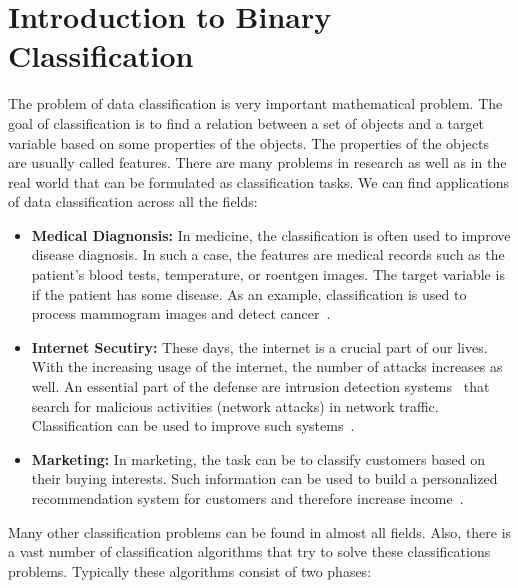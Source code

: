 \chapter{Introduction to Binary Classification}

The problem of data classification is very important mathematical problem. The goal of classification is to find a relation between a set of objects and a target variable based on some properties of the objects. The properties of the objects are usually called features. There are many problems in research as well as in the real world that can be formulated as classification tasks. We can find applications of data classification across all the fields:
\begin{itemize}
  \item \textbf{Medical Diagnonsis:} In medicine, the classification is often used to improve disease diagnosis. In such a case, the features are medical records such as the patient's blood tests, temperature, or roentgen images. The target variable is if the patient has some disease. As an example, classification is used to process mammogram images and detect cancer~\cite{viale2012current, levy2016breast}.
  \item \textbf{Internet Secutiry:} These days, the internet is a crucial part of our lives. With the increasing usage of the internet, the number of attacks increases as well. An essential part of the defense are intrusion detection systems~\cite{grill2016learning, scarfone2007guide} that search for malicious activities (network attacks) in network traffic. Classification can be used to improve such systems~\cite{giacinto2002intrusion, shanbhag2009accurate}.
  \item \textbf{Marketing:} In marketing, the task can be to classify customers based on their buying interests. Such information can be used to build a personalized recommendation system for customers and therefore increase income~\cite{kaefer2005neural, zhang2007building}.
\end{itemize}
Many other classification problems can be found in almost all fields. Also, there is a vast number of classification algorithms that try to solve these classifications problems. Typically these algorithms consist of two phases:
